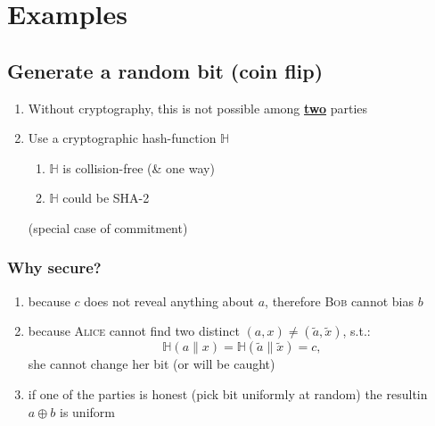 \documentclass{report}
\begin{document}
 \section{Examples}
 \begin{adjustwidth}{2em}{2em}
 	\subsection{Generate a random bit (coin flip)}
 	\begin{adjustwidth}{2em}{2em}
 		\begin{center}\begin{tikzpicture}
 		\end{tikzpicture}\end{center}
 		\begin{enumerate}[-]
 			\item Without cryptography, this is not possible among \textbf{\underline{two}} parties
 			\item Use a cryptographic hash-function $\mathbb{H}$
 			\begin{enumerate}[\tiny{\textbullet}]
 				\item $\mathbb{H}$ is collision-free (\& one way)
 				\item $\mathbb{H}$ could be SHA-2
 			\end{enumerate}
 			(special case of commitment)
 		\end{enumerate}
 		\begin{center}\begin{tikzpicture}
 		\end{tikzpicture}\end{center}
 		\subsubsection{Why secure?}
 		\begin{adjustwidth}{1em}{}
 			\begin{enumerate}[-]
 				\item because $c$ does not reveal anything about $a$, therefore \textsc{Bob} cannot bias $b$
 				\item because \textsc{Alice} cannot find two distinct $(a,x) \neq (\tilde{a}, \tilde{x})$, s.t.:
 				\[
 					\mathbb{H}(a \| x) = \mathbb{H}(\tilde{a} \| \tilde{x}) = c,
 				\]
 				she cannot change her bit (or will be caught)
 				\item if one of the parties is honest (pick bit uniformly at random) the resultin $a \oplus b$ is uniform
 			\end{enumerate}
 		\end{adjustwidth}
 	\end{adjustwidth}

\end{adjustwidth}
\end{document}
